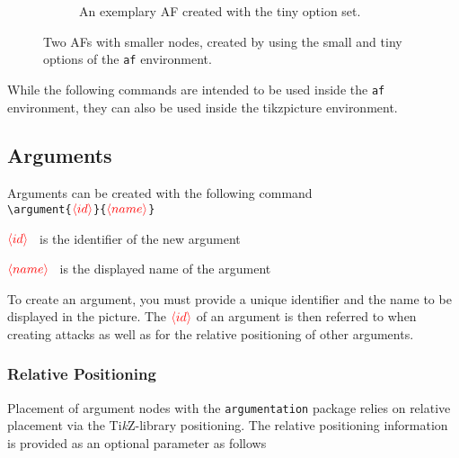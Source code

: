 \documentclass{article}
\newcommand{\tikzname}{Ti\emph{k}Z\xspace}
\newcommand{\argumentation}{\texttt{argumentation}\xspace}
\newcommand{\opt}[2][red]{\ensuremath{\textcolor{#1}{\langle #2\rangle}}}
\begin{document}
\begin{figure}[ht]
\begin{subfigure}{0.48\textwidth}
\begin{af}[tiny]

        \end{af}
        \caption{An exemplary AF created with the \textsf{tiny} option set.}
        \label{fig:example_tiny}
    \end{subfigure}
    \caption{Two AFs with smaller nodes, created by using the \textsf{small} and \textsf{tiny} options of the \texttt{af} environment.}
    \label{fig:mini_afs}
    
\end{figure}

While the following commands are intended to be used inside the \texttt{af} environment, they can also be used inside the \textsf{tikzpicture} environment.

\subsection{Arguments}
    Arguments can be created with the following command\\

    \noindent
    \verb|\argument{|\opt{id}\verb|}{|\opt{name}\verb|}|
    
    \begin{list}{}{\leftmargin=\parindent\rightmargin=0pt}
        \item\opt{id}~ is the identifier of the new argument
        \item\opt{name}~ is the displayed name of the argument
        \item To create an argument, you must provide a unique identifier and the name to be displayed in the picture.
        The \opt{id} of an argument is then referred to when creating attacks as well as for the relative positioning of other arguments.

    \end{list}

\subsubsection{Relative Positioning}    
    Placement of argument nodes with the \argumentation package relies on relative placement via the \tikzname-library \textsf{positioning}.
    The relative positioning information is provided as an optional parameter as follows\\
\end{document}
